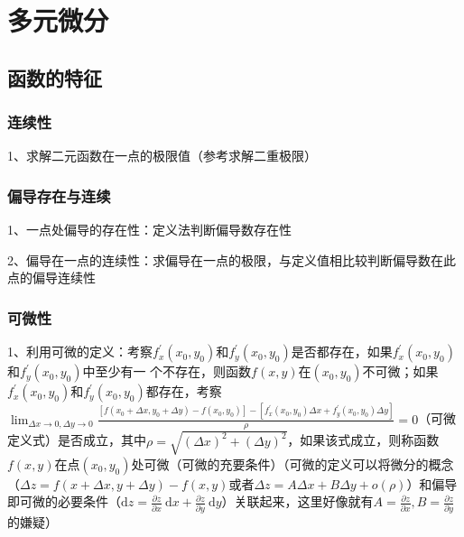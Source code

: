 \chapter{多元微分}

\section{函数的特征}



\subsection{连续性}

1、求解二元函数在一点的极限值（参考求解二重极限）



\subsection{偏导存在与连续}

1、一点处偏导的存在性：定义法判断偏导数存在性

2、偏导在一点的连续性：求偏导在一点的极限，与定义值相比较判断偏导数在此点的偏导连续性



\subsection{可微性}

1、利用可微的定义：考察$f_{x}^{\prime}\left(x_{0}, y_{0}\right)和f_{y}^{\prime}\left(x_{0}, y_{0}\right)$是否都存在，如果$f_{x}^{\prime}\left(x_{0}, y_{0}\right)$和$f_{y}^{\prime}\left(x_{0}, y_{0}\right)$中至少有一 个不存在，则函数$f(x, y)$在$\left(x_{0}, y_{0}\right)$不可微；如果$f_{x}^{\prime}\left(x_{0}, y_{0}\right)$和$f_{y}^{\prime}\left(x_{0}, y_{0}\right)$都存在，考察$\lim_{\Delta x \rightarrow 0,\Delta y \rightarrow 0}\frac{\left[f\left(x_{0}+\Delta x, y_{0}+\Delta y\right)-f\left(x_{0}, y_{0}\right)\right]-\left[f_{x}^{\prime}\left(x_{0}, y_{0}\right) \Delta x+f_{y}^{\prime}\left(x_{0}, y_{0}\right) \Delta y\right]}{\rho}=0$（可微定义式）是否成立，其中$\rho=\sqrt{(\Delta x)^{2}+(\Delta y)^{2}}$，如果该式成立，则称函数$f(x, y)$在点$(x_0, y_0)$处可微（可微的充要条件）（可微的定义可以将微分的概念（$\Delta z=f(x+\Delta x, y+\Delta y)-f(x, y)$或者$\Delta z=A \Delta x+B \Delta y+o(\rho)$）和偏导即可微的必要条件（$\mathrm{d} z=\frac{\partial z}{\partial x} \mathrm{~d} x+\frac{\partial z}{\partial y} \mathrm{~d} y$）关联起来，这里好像就有$A=\frac{\partial z}{\partial x},B=\frac{\partial z}{\partial y}$的嫌疑）

